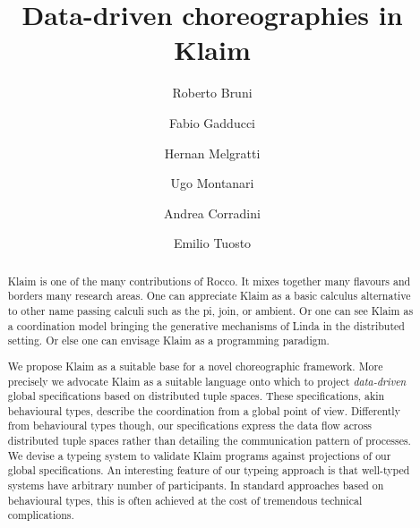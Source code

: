 \documentclass[runningheads,a4paper]{llncs}
\begin{document}
\mainmatter  %

\title{
  Data-driven choreographies in Klaim
}


%
%

\author{
  Roberto Bruni  \and
  Fabio Gadducci  \and
  Hernan Melgratti  \and
  Ugo Montanari  \and
  Andrea Corradini  \and
  Emilio Tuosto
}
	

\maketitle

\begin{abstract}
  Klaim is one of the many contributions of Rocco.
  It mixes together many flavours and borders many research areas.
  One can appreciate Klaim as a basic calculus alternative to other
  name passing calculi such as the pi, join, or ambient.
  Or one can see Klaim as a coordination model bringing the generative
  mechanisms of Linda in the distributed setting.
  Or else one can envisage Klaim as a programming paradigm.

  We propose Klaim as a suitable base for a novel choreographic
  framework.
  More precisely we advocate Klaim as a suitable language onto which
  to project \emph{data-driven} global specifications based on
  distributed tuple spaces.
  These specifications, akin behavioural types, describe the coordination
  from a global point of view.
  Differently from behavioural types though, our specifications
  express the data flow across distributed tuple spaces rather than
  detailing the communication pattern of processes.
  We devise a typeing system to validate Klaim programs against projections
  of our global specifications.
  An interesting feature of our typeing approach is that well-typed
  systems have arbitrary number of participants.
  In standard approaches based on behavioural types, this is often
  achieved at the cost of tremendous technical complications.
\end{abstract}
\end{document}

